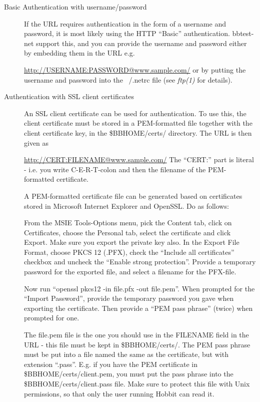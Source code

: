  \begin{description}
\item[Basic Authentication with username/password] If the URL requires
  authentication in the form of a username and password, it is most
  likely using the HTTP ``Basic'' authentication. bbtest-net support
  this, and you can provide the username and password either by
  embedding them in the URL e.g.  

 
\url{http://USERNAME:PASSWORD@www.sample.com/} 
 or by putting the username and password into the ~/.netrc file (see
 \emph{ftp(1)} for details). 


 

\item[Authentication with SSL client certificates] An SSL client
  certificate can be used for authentication. To use this, the client
  certificate must be stored in a PEM-formatted file together with the
  client certificate key, in the \$BBHOME/certs/ directory. The URL is
  then given as  

 
\url{http://CERT:FILENAME@www.sample.com/} 
 The ``CERT:'' part is literal - i.e. you write C-E-R-T-colon and then
 the filename of the PEM-formatted certificate.  

 A PEM-formatted certificate file can be generated based on
 certificates stored in Microsoft Internet Explorer and OpenSSL. Do as
 follows:  

 From the MSIE Tools-Options menu, pick the Content tab, click on
 Certificates, choose the Personal tab, select the certificate and
 click Export. Make sure you export the private key also. In the
 Export File Format, choose PKCS 12 (.PFX), check the ``Include all
 certificates'' checkbox and uncheck the ``Enable strong
 protection''. Provide a temporary password for the exported file, and
 select a filename for the PFX-file.  

 Now run ``openssl pkcs12 -in file.pfx -out file.pem''. When prompted
 for the ``Import Password'', provide the temporary password you gave
 when exporting the certificate. Then provide a ``PEM pass phrase''
 (twice) when prompted for one.  

 The file.pem file is the one you should use in the FILENAME field in
 the URL - this file must be kept in \$BBHOME/certs/. The PEM pass
 phrase must be put into a file named the same as the certificate, but
 with extension ``.pass''. E.g. if you have the PEM certificate in
 \$BBHOME/certs/client.pem, you must put the pass phrase into the
 \$BBHOME/certs/client.pass file. Make sure to protect this file with
 Unix permissions, so that only the user running Hobbit can read it. 


\end{description}
